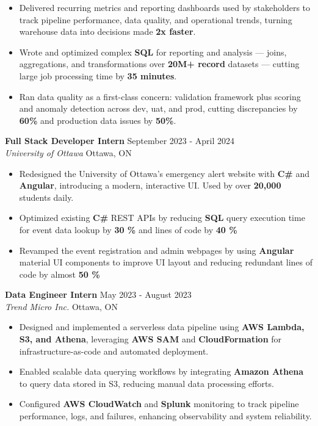 \documentclass[a4paper]{article}
\begin{document}
\begin{itemize}
\item Delivered recurring metrics and reporting dashboards used by stakeholders to track pipeline performance, data quality, and operational trends, turning warehouse data into decisions made \textbf{2x faster}.

\item Wrote and optimized complex \textbf{SQL} for reporting and analysis — joins, aggregations, and transformations over \textbf{20M+ record} datasets — cutting large job processing time by \textbf{35 minutes}.

\item Ran data quality as a first-class concern: validation framework plus scoring and anomaly detection across dev, uat, and prod, cutting discrepancies by \textbf{60\%} and production data issues by \textbf{50\%}.

\end{itemize}

\textbf{Full Stack Developer Intern } \hfill September 2023 - April 2024\\
\textit{University of Ottawa} \hfill Ottawa, ON\\
\vspace{-2mm}
\begin{itemize} \itemsep -4pt
    \item Redesigned the University of Ottawa's emergency alert website with \textbf{C\#} and \textbf{Angular}, introducing a modern, interactive UI. Used by over \textbf{20,000} students daily.
     \item Optimized existing \textbf{C\#} REST APIs by reducing \textbf{SQL} query execution time for event data lookup by \textbf{30 \%} and lines of code by \textbf{40 \%}
    \item Revamped the event registration and admin webpages by using \textbf{Angular} material UI components to improve UI layout and reducing redundant lines of code by almost \textbf{50 \%}
\end{itemize}

\textbf{Data Engineer Intern} \hfill May 2023 - August 2023\\
\textit{Trend Micro Inc.} \hfill Ottawa, ON\\
\vspace{-2mm}
\begin{itemize} \itemsep -4pt

\item Designed and implemented a serverless data pipeline using \textbf{AWS Lambda, S3, and Athena}, leveraging \textbf{AWS SAM} and \textbf{CloudFormation} for infrastructure-as-code and automated deployment.

\item Enabled scalable data querying workflows by integrating \textbf{Amazon Athena} to query data stored in S3, reducing manual data processing efforts.

\item Configured \textbf{AWS CloudWatch} and \textbf{Splunk} monitoring to track pipeline performance, logs, and failures, enhancing observability and system reliability.

\end{itemize}
\end{document}
